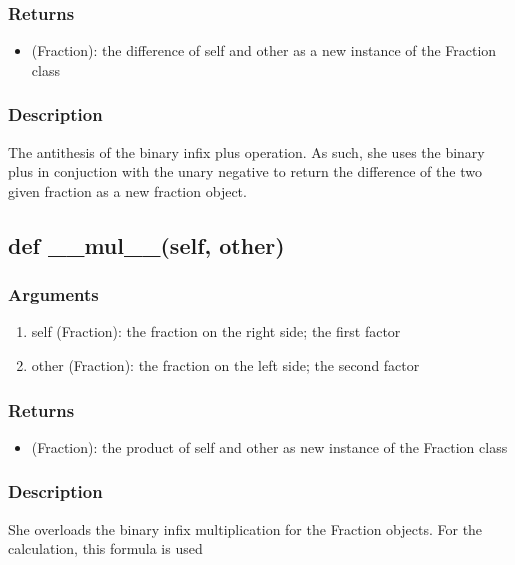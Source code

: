 \documentclass[refman]{scrartcl}
\begin{document}
\subsubsection*{Returns}

\begin{itemize}
	\item (Fraction): the difference of self and other as a new instance of the Fraction class
\end{itemize}

\subsubsection*{Description}

The antithesis of the binary infix plus operation. As such, she uses the binary plus in conjuction with the unary negative to return the difference of the two given fraction as a new fraction object.

\subsection{def \_\_mul\_\_(self, other)}

\subsubsection*{Arguments}

\begin{enumerate}
	\item self (Fraction): the fraction on the right side; the first factor
	\item other (Fraction): the fraction on the left side; the second factor
\end{enumerate}

\subsubsection*{Returns}

\begin{itemize}
	\item (Fraction): the product of self and other as new instance of the Fraction class
\end{itemize}

\subsubsection*{Description}

She overloads the binary infix multiplication for the Fraction objects. For the calculation, this formula is used
\end{document}
